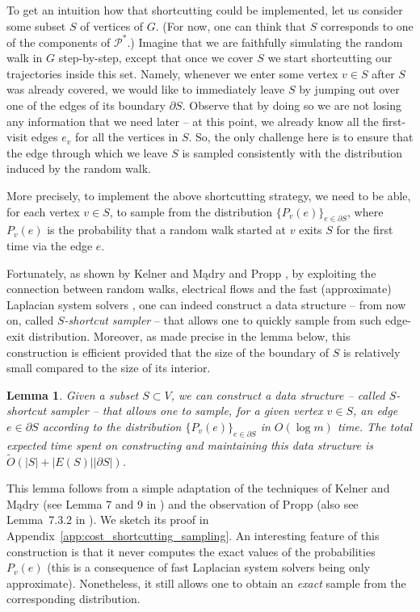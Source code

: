 \documentclass[11pt, letterpaper]{article}
\newtheorem{lemma}[theorem]{Lemma}
\newcommand{\cP}{\mathcal{P}}
\newcommand{\tO}{\widetilde{O}}
\begin{document}
To get an intuition how that shortcutting could be implemented, let us consider some subset $S$ of vertices of $G$. (For now, one can think that $S$ corresponds to one of the components of $\cP^*$.) Imagine that we are faithfully simulating the random walk in $G$ step-by-step, except that once we cover $S$ we start shortcutting our trajectories inside this set. Namely, whenever we enter some vertex $v\in S$ after $S$ was already covered, we would like to immediately leave $S$ by jumping out over one of the edges of its boundary $\partial S$. Observe that by doing so we are not losing any information that we need later -- at this point, we already know all the first-visit edges $e_v$ for all the vertices in $S$. So, the only challenge here is to ensure that the edge through which we leave $S$ is sampled consistently with the distribution induced by the random walk.  

More precisely, to implement the above shortcutting strategy, we need to be able, for each vertex $v\in S$, to sample from the distribution $\{P_v(e)\}_{e\in \partial S}$, where $P_v(e)$ is the probability that a random walk started at $v$ exits $S$ for the first time via the edge $e$. 


Fortunately, as shown by Kelner and Mądry \cite{KelnerM09} and Propp \cite{Propp10}, by exploiting the connection between random walks, electrical flows and the fast (approximate) Laplacian system solvers \cite{SpielmanT03,SpielmanT04,KoutisMP10,KoutisMP11,KelnerOSZ13}, one can indeed construct a data structure -- from now on, called {\em $S$-shortcut sampler} -- that allows one to quickly sample from such edge-exit distribution. Moreover, as made precise in the lemma below, this construction is efficient provided that the size of the boundary of $S$ is relatively small compared to the size of its interior. 

\begin{lemma}\label{lem:cost_shortcutting_sampling}
Given a subset $S \subset V$, we can construct a data structure -- called {\em $S$-shortcut sampler} -- that allows one to sample, for a given vertex $v\in S$, an edge $e\in \partial S$ according to the distribution $\{P_v(e)\}_{e\in \partial S}$ in $O(\log m)$ time. The total expected time spent on constructing and maintaining this data structure is $\tO(|S|+|E(S)||\partial S|)$.
\end{lemma}
This lemma follows from a simple adaptation of the techniques of Kelner and Mądry (see Lemma 7 and 9 in \cite{KelnerM09}) and the observation of Propp \cite{Propp10} (also see Lemma~7.3.2 in \cite{Madry11}). We sketch its proof in Appendix~\ref{app:cost_shortcutting_sampling}. An interesting feature of this construction is that it never computes the exact values of the probabilities $P_v(e)$ (this is a consequence of fast Laplacian system solvers being only approximate). Nonetheless, it still allows one to obtain an {\em exact} sample from the corresponding distribution.
\end{document}

